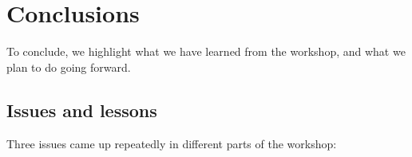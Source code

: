 \documentclass[11pt, oneside]{amsart}
\newcommand{\todo}[1]{{\color{blue}$\blacksquare$~\textsf{[TODO: #1]}}}
\newcommand{\note}[1]{ {\textcolor{red}    { #1 }}}
\begin{document}


\section{Conclusions} \label{sec:conclusions}

To conclude, we highlight what we have learned from the workshop, and what we plan to do going forward.





\subsection{Issues and lessons}


Three issues came up repeatedly in different parts of the workshop:
\end{document}
